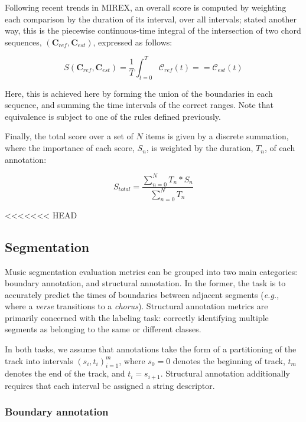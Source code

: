 \documentclass{article}
\def\eg{\emph{e.g.\/}}
\begin{document}
Following recent trends in MIREX, an overall score is computed by weighting each comparison by the duration of its interval, over all intervals; stated another way, this is the piecewise continuous-time integral of the intersection of two chord sequences, $(\mathbf{C}_{ref}, \mathbf{C}_{est})$, expressed as follows:

\begin{equation}
S(\mathbf{C}_{ref}, \mathbf{C}_{est}) = \frac{1}{T}\int_{t=0}^{T} \mathcal{C}_{ref}(t) == \mathcal{C}_{est}(t)
\end{equation}

\noindent Here, this is achieved here by forming the union of the boundaries in each sequence, and summing the time intervals of the correct ranges. Note that equivalence is subject to one of the rules defined previously. 

Finally, the total score over a set of $N$ items is given by a discrete summation, where the importance of each score, $S_n$, is weighted by the duration, $T_n$, of each annotation:

\begin{equation}
S_{total} = \frac{\sum_{n=0}^{N} T_n*S_n}{\sum_{n=0}^{N} T_n}
\end{equation}

<<<<<<< HEAD

\subsection{Segmentation}

Music segmentation evaluation metrics can be grouped into two main categories: boundary annotation, and structural annotation.
In the former, the task is to accurately predict the times of boundaries between adjacent segments (\eg, where a \emph{verse} transitions to a \emph{chorus}).
Structural annotation metrics are primarily concerned with the labeling task: correctly identifying multiple segments as belonging to the same or different classes.

In both tasks, we assume that annotations take the form of a partitioning of the track 
into intervals ${(s_i, t_i)}_{i=1}^m$, where $s_0=0$ denotes the beginning of track, 
$t_m$ denotes the end of the track, and $t_i = s_{i+1}$.
Structural annotation additionally requires that each interval be assigned a string
descriptor.


\subsubsection{Boundary annotation}
\end{document}
